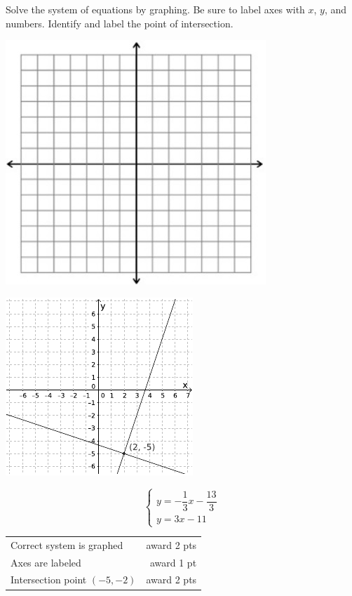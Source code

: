 {
	Solve the system of equations by graphing. Be sure to label axes with $x$, $y$, and numbers. Identify and label the point of intersection. \begin{onlyproblem}\begin{center}\includegraphics{fig-graphpaper.png}\end{center}\end{onlyproblem} \begin{onlysolution}\begin{center}\includegraphics{fig095-10-5-c-answer}\end{center}\end{onlysolution}
	$$\begin{cases} y=-\dfrac{1}{3}x-\dfrac{13}{3}\\ y=3x-11\end{cases}$$
}
{
	\begin{tabular}{l r}
	Correct system is graphed & award 2 pts\\
	Axes are labeled & award 1 pt\\
	Intersection point $(-5,-2)$ & award 2 pts
	\end{tabular}
}

